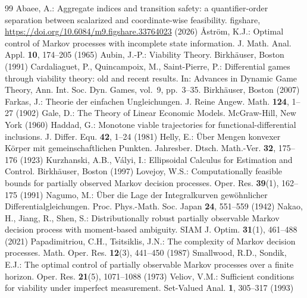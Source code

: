 \documentclass[11pt,a4paper]{article}
\theoremstyle{plain}
\theoremstyle{definition}
\theoremstyle{remark}
\begin{document}
\renewcommand{\refname}{References}
\begin{thebibliography}{99}
\small
{} Abaee, A.: Aggregate indices and transition safety: a quantifier-order separation between scalarized and coordinate-wise feasibility. figshare, \url{https://doi.org/10.6084/m9.figshare.33764023} (2026)
 \r{A}str\"om, K.J.: Optimal control of Markov processes with incomplete state information. J. Math. Anal. Appl. \textbf{10}, 174--205 (1965)
 Aubin, J.-P.: Viability Theory. Birkh\"auser, Boston (1991)
 Cardaliaguet, P., Quincampoix, M., Saint-Pierre, P.: Differential games through viability theory: old and recent results. In: Advances in Dynamic Game Theory, Ann. Int. Soc. Dyn. Games, vol.~9, pp.~3--35. Birkh\"auser, Boston (2007)
 Farkas, J.: Theorie der einfachen Ungleichungen. J. Reine Angew. Math. \textbf{124}, 1--27 (1902)
 Gale, D.: The Theory of Linear Economic Models. McGraw-Hill, New York (1960)
 Haddad, G.: Monotone viable trajectories for functional-differential inclusions. J. Differ. Equ. \textbf{42}, 1--24 (1981)
 Helly, E.: \"Uber Mengen konvexer K\"orper mit gemeinschaftlichen Punkten. Jahresber. Dtsch. Math.-Ver. \textbf{32}, 175--176 (1923)
 Kurzhanski, A.B., V\'alyi, I.: Ellipsoidal Calculus for Estimation and Control. Birkh\"auser, Boston (1997)
 Lovejoy, W.S.: Computationally feasible bounds for partially observed Markov decision processes. Oper. Res. \textbf{39}(1), 162--175 (1991)
 Nagumo, M.: \"Uber die Lage der Integralkurven gew\"ohnlicher Differentialgleichungen. Proc. Phys.-Math. Soc. Japan \textbf{24}, 551--559 (1942)
 Nakao, H., Jiang, R., Shen, S.: Distributionally robust partially observable Markov decision process with moment-based ambiguity. SIAM J. Optim. \textbf{31}(1), 461--488 (2021)
 Papadimitriou, C.H., Tsitsiklis, J.N.: The complexity of Markov decision processes. Math. Oper. Res. \textbf{12}(3), 441--450 (1987)
 Smallwood, R.D., Sondik, E.J.: The optimal control of partially observable Markov processes over a finite horizon. Oper. Res. \textbf{21}(5), 1071--1088 (1973)
 Veliov, V.M.: Sufficient conditions for viability under imperfect measurement. Set-Valued Anal. \textbf{1}, 305--317 (1993)
\end{thebibliography}
\end{document}
